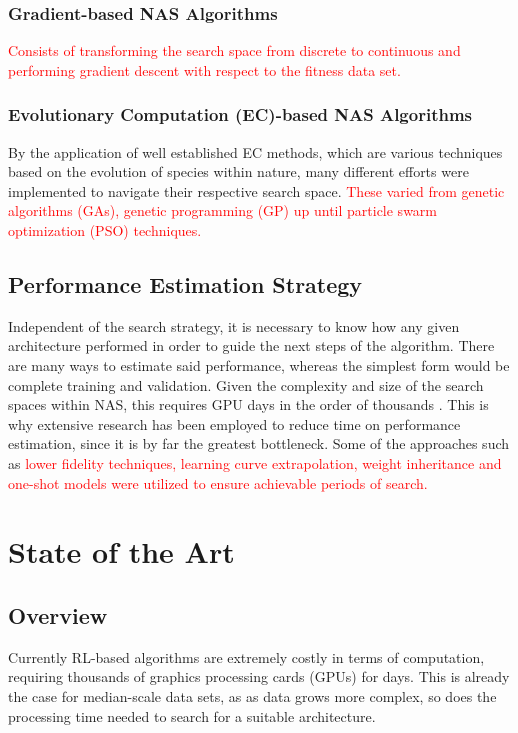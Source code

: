 \documentclass[10pt,        %
               a4paper,     %
               journal,     %
               ]{IEEEtran}
\begin{document}
\subsubsection{\textbf{Gradient}-based NAS Algorithms}
\textcolor{red}{
Consists of transforming the search space from discrete to continuous and performing
gradient descent with respect to the fitness data set.
}

\subsubsection{\textbf{Evolutionary Computation} (EC)-based NAS Algorithms}
By the application of well established EC methods, which are various techniques based on the evolution of
species within nature, many different efforts were implemented to navigate their respective search space.
\textcolor{red}{
These varied from genetic algorithms (GAs), genetic programming (GP) up until particle swarm optimization (PSO)
techniques.
}


\subsection{Performance Estimation Strategy}
\label{PES}
Independent of the search strategy, it is necessary to know how any given architecture performed in order
to guide the next steps of the algorithm. There are many ways to estimate said performance, whereas the simplest
form would be complete training and validation. Given the complexity and size of the search spaces within NAS, this
requires GPU days in the order of thousands \cite{wistuba2019survey}. This is why extensive research has been
employed to reduce time on performance estimation, since it is by far the greatest bottleneck.
Some of the approaches such as
\textcolor{red}{
lower fidelity techniques, learning curve extrapolation, weight inheritance and one-shot models were utilized
to ensure achievable periods of search.
}

\section{State of the Art}
\label{SOA}

\subsection{Overview}
Currently RL-based algorithms are extremely costly in terms of computation, requiring thousands of
graphics processing cards (GPUs) for days. This is already the case for median-scale data sets, as
as data grows more complex, so does the processing time needed to search for a suitable architecture.
\end{document}
